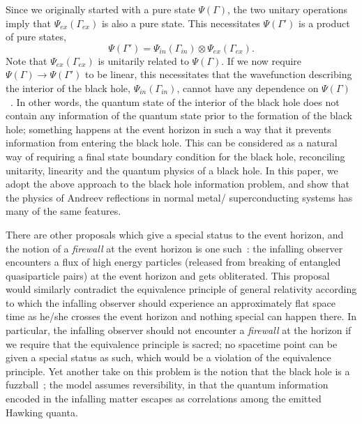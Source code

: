 \documentclass[10pt,letterpaper,aps,onecolumn,superscriptaddress,floatfix,notitlepage]{revtex4-1}
\begin{document}
	Since we originally started with a pure state $\Psi(\Gamma)$, the two unitary operations imply that $\Psi_{ex}(\Gamma_{ex})$ is also a pure state. This necessitates $\Psi(\Gamma')$ is a product of pure states,
	\begin{equation}
	\Psi(\Gamma') =\Psi_{in}(\Gamma_{in})\otimes\Psi_{ex}(\Gamma_{ex}).
	\end{equation}
	Note that $\Psi_{ex}(\Gamma_{ex})$ is unitarily related to $\Psi(\Gamma)$. If we now require $\Psi(\Gamma)\rightarrow\Psi(\Gamma')$ to be linear, this necessitates that the wavefunction describing the interior of the black hole, $\Psi_{in}(\Gamma_{in})$, cannot have any dependence on $\Psi(\Gamma)$~\cite{complementarity,infopara}. In other words, the quantum state of the interior of the black hole does not contain any information of the quantum state prior to the formation of the black hole; something happens at the event horizon in such a way that it prevents information from entering the black hole. This can be considered as a natural way of requiring a final state boundary condition for the black hole, reconciling unitarity, linearity and the quantum physics of a black hole. In this paper, we adopt the above approach to the black hole information problem, and show that the physics of Andreev reflections in normal metal/ superconducting systems has many of the same features.
	
	There are other proposals which give a special status to the event horizon, and the notion of a \textit{firewall} at the event horizon is one such~\cite{firewall}: the infalling observer encounters a flux of high energy particles (released from breaking of entangled quasiparticle pairs) at the event horizon and gets obliterated. This proposal would similarly contradict the equivalence principle of general relativity according to which the infalling observer should experience an approximately flat space time as he/she crosses the event horizon and nothing special can happen there. In particular, the infalling observer should not encounter a \textit{firewall} at the horizon if we require that the equivalence principle is sacred; no spacetime point can be given a special status as such, which would be a violation of the equivalence principle. Yet another take on this problem is the notion that the black hole is a fuzzball~\cite{mathur2009fuzzballs}; the model assumes reversibility, in that the quantum information encoded in the infalling matter escapes as correlations among the emitted Hawking quanta.     
	
\end{document}

